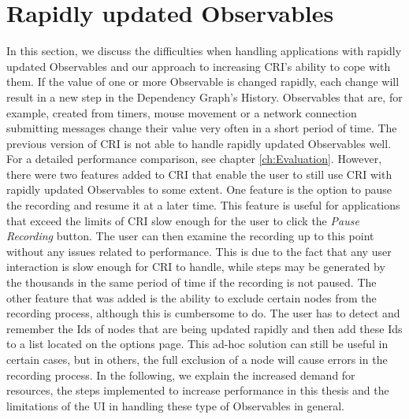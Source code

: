 \section{Rapidly updated Observables}
\label{sec:RapidlyUpdatedObservables}
In this section, we discuss the difficulties when handling applications with rapidly updated Observables and our approach to increasing CRI's ability to cope with them. If the value of one or more Observable is changed rapidly, each change will result in a new step in the Dependency Graph's History. Observables that are, for example, created from timers, mouse movement or a network connection submitting messages change their value very often in a short period of time. The previous version of CRI is not able to handle rapidly updated Observables well. For a detailed performance comparison, see chapter \ref{ch:Evaluation}. However, there were two features added to CRI that enable the user to still use CRI with rapidly updated Observables to some extent. One feature is the option to pause the recording and resume it at a later time. This feature is useful for applications that exceed the limits of CRI slow enough for the user to click the \emph{Pause Recording} button. The user can then examine the recording up to this point without any issues related to performance. This is due to the fact that any user interaction is slow enough for CRI to handle, while steps may be generated by the thousands in the same period of time if the recording is not paused. The other feature that was added is the ability to exclude certain nodes from the recording process, although this is cumbersome to do. The user has to detect and remember the Ids of nodes that are being updated rapidly and then add these Ids to a list located on the options page. This ad-hoc solution can still be useful in certain cases, but in others, the full exclusion of a node will cause errors in the recording process. In the following, we explain the increased demand for resources, the steps implemented to increase performance in this thesis and the limitations of the UI in handling these type of Observables in general. 

